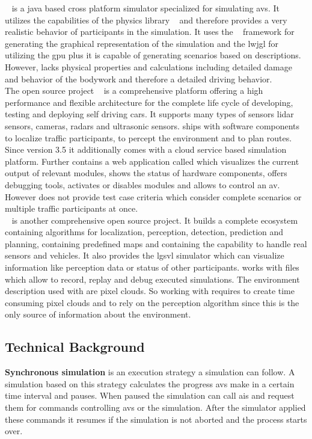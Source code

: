 \opends{}~\cite{opends} is a java based cross platform simulator specialized for simulating \glspl{av}.
It utilizes the capabilities of the physics library \jbullet{}~\cite{jBullet} and therefore provides a very realistic behavior of participants in the simulation.
It uses the \jmonkey{}~\cite{jmonkey} framework for generating the graphical representation of the simulation and the \gls{lwjgl} for utilizing the \gls{gpu} plus it is capable of generating scenarios based on \opendrive{} descriptions.
However, \opends{} lacks physical properties and calculations including detailed damage and behavior of the bodywork and therefore a detailed driving behavior.\\
The open source project \apollo{}~\cite{apollo} is a comprehensive platform offering a high performance and flexible architecture for the complete life cycle of developing, testing and deploying self driving cars.
It supports many types of sensors \eg{} \gls{lidar} sensors, cameras, radars and ultrasonic sensors.
\apollo{} ships with software components to localize traffic participants, to percept the environment and to plan routes.
Since version 3.5 it additionally comes with a cloud service based simulation platform.
Further \apollo{} contains a web application called \dreamview{} which visualizes the current output of relevant modules, shows the status of hardware components, offers debugging tools, activates or disables modules and allows to control an \gls{av}.
However \apollo{} does not provide test case criteria which consider complete scenarios or multiple traffic participants at once.\\
\autoware{}~\cite{autoware, autowareOpen, autowareOnBoard} is another comprehensive open source project.
It builds a complete ecosystem containing algorithms for localization, perception, detection, prediction and planning, containing predefined maps and containing the capability to handle real sensors and vehicles.
It also provides the \gls{lgsvl} simulator which can visualize information like perception data or status of other participants.
\autoware{} works with \rosbag{} files~\cite{rosbag} which allow to record, replay and debug executed simulations.
The environment description used with \autoware{} are pixel clouds.
So working with \autoware{} requires to create time consuming pixel clouds and to rely on the perception algorithm since this is the only source of information about the environment.

\subsection{Technical Background}
\textbf{Synchronous simulation} is an execution strategy a simulation can follow.
A simulation based on this strategy calculates the progress \glspl{av} make in a certain time interval and pauses.
When paused the simulation can call \glspl{ai} and request them for commands controlling \glspl{av} or the simulation.
After the simulator applied these commands it resumes if the simulation is not aborted and the process starts over.\par

